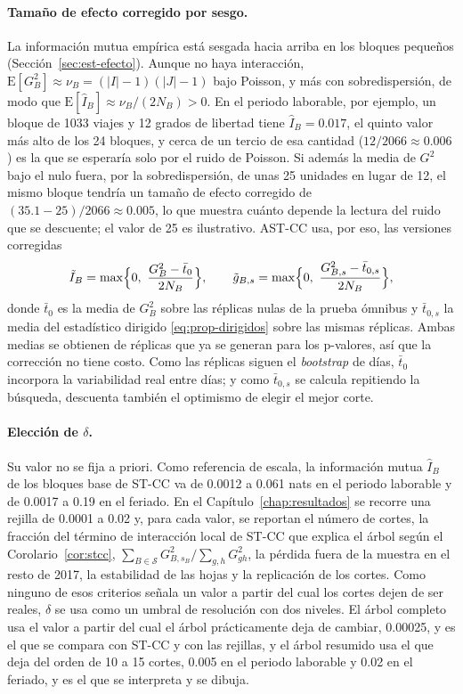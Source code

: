 \paragraph{Tamaño de efecto corregido por sesgo.} La información mutua empírica
está sesgada hacia arriba en los bloques pequeños
(Sección~\ref{sec:est-efecto}). Aunque no haya interacción,
$\mathrm{E}[G^2_B]\approx\nu_B = (|I|-1)(|J|-1)$ bajo Poisson, y más con
sobredispersión, de modo que $\mathrm{E}[\hat I_B]\approx \nu_B/(2N_B) > 0$. En el
periodo laborable, por ejemplo, un bloque de 1033 viajes y 12 grados de
libertad tiene $\hat I_B = 0.017$, el quinto valor más alto de los 24 bloques,
y cerca de un tercio de esa cantidad ($12/2066\approx 0.006$) es la que se
esperaría solo por el ruido de Poisson. Si además la media de $G^2$ bajo el nulo
fuera, por la sobredispersión, de unas 25 unidades en lugar de 12, el mismo
bloque tendría un tamaño de efecto corregido de $(35.1-25)/2066\approx 0.005$, lo
que muestra cuánto depende la lectura del ruido que se descuente; el valor de 25 es
ilustrativo. AST-CC usa, por eso, las versiones
corregidas
\begin{equation}\label{eq:prop-efecto-corregido}
  \tilde I_B = \max\Bigl\{0,\ \frac{G^2_B - \bar t_0}{2N_B}\Bigr\},
  \qquad
  \tilde g_{B,s} = \max\Bigl\{0,\ \frac{G^2_{B,s} - \bar t_{0,s}}{2N_B}\Bigr\},
\end{equation}
donde $\bar t_0$ es la media de $G^2_B$ sobre las réplicas nulas de la prueba
ómnibus y $\bar t_{0,s}$ la media del estadístico dirigido
\eqref{eq:prop-dirigidos} sobre las mismas réplicas. Ambas medias se obtienen de
réplicas que ya se generan para los p-valores, así que la corrección no tiene
costo. Como las réplicas siguen el \emph{bootstrap} de días, $\bar t_0$ incorpora la
variabilidad real entre días; y como $\bar t_{0,s}$ se calcula repitiendo la
búsqueda, descuenta también el optimismo de elegir el mejor corte.

\paragraph{Elección de $\delta$.} Su valor no se fija a priori. Como referencia
de escala, la información mutua $\hat I_B$ de los bloques base de ST-CC va de
0.0012 a 0.061 nats en el periodo laborable y de 0.0017 a 0.19 en el feriado.
En el Capítulo~\ref{chap:resultados} se recorre una rejilla de 0.0001 a 0.02 y,
para cada valor, se reportan el número de cortes, la fracción del término de
interacción local de ST-CC que explica el árbol según el
Corolario~\ref{cor:stcc},
$\sum_{B\in\mathcal{S}}G^2_{B,s_B}\big/\sum_{g,h}G^2_{gh}$, la pérdida fuera de
la muestra en el resto de 2017, la estabilidad de las hojas y la replicación de
los cortes. Como ninguno de esos criterios señala un valor a partir del cual los
cortes dejen de ser reales, $\delta$ se usa como un umbral de resolución con dos
niveles. El árbol completo usa el valor a partir del cual el árbol prácticamente
deja de cambiar, 0.00025, y es el que se compara con ST-CC y con las rejillas, y el árbol resumido
usa el que deja del orden de 10 a 15 cortes, 0.005 en el periodo laborable y 0.02
en el feriado, y es el que se interpreta y se dibuja.

